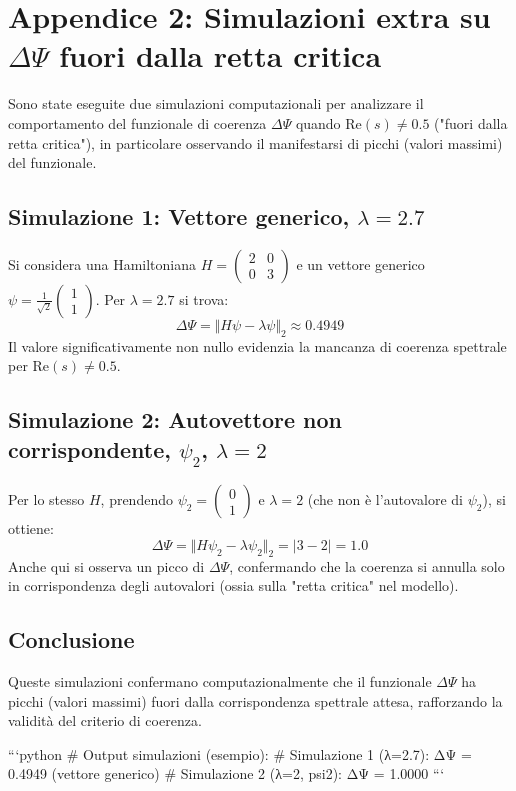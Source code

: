 \section*{Appendice 2: Simulazioni extra su $\Delta\Psi$ fuori dalla retta critica}

Sono state eseguite due simulazioni computazionali per analizzare il comportamento del funzionale di coerenza $\Delta\Psi$ quando $\mathrm{Re}(s)\neq 0.5$ ("fuori dalla retta critica"), in particolare osservando il manifestarsi di picchi (valori massimi) del funzionale.

\subsection*{Simulazione 1: Vettore generico, $\lambda=2.7$}

Si considera una Hamiltoniana $H = \begin{pmatrix}2 & 0\\0 & 3\end{pmatrix}$ e un vettore generico $\psi = \frac{1}{\sqrt{2}}\begin{pmatrix}1\\1\end{pmatrix}$.  
Per $\lambda=2.7$ si trova:
\[
\Delta\Psi = \Vert H\psi - \lambda\psi \Vert_2 \approx 0.4949
\]
Il valore significativamente non nullo evidenzia la mancanza di coerenza spettrale per $\mathrm{Re}(s)\neq 0.5$.

\subsection*{Simulazione 2: Autovettore non corrispondente, $\psi_2$, $\lambda=2$}

Per lo stesso $H$, prendendo $\psi_2 = \begin{pmatrix}0\\1\end{pmatrix}$ e $\lambda=2$ (che non è l'autovalore di $\psi_2$), si ottiene:
\[
\Delta\Psi = \Vert H\psi_2 - \lambda\psi_2 \Vert_2 = |3-2| = 1.0
\]
Anche qui si osserva un picco di $\Delta\Psi$, confermando che la coerenza si annulla solo in corrispondenza degli autovalori (ossia sulla "retta critica" nel modello).

\subsection*{Conclusione}

Queste simulazioni confermano computazionalmente che il funzionale $\Delta\Psi$ ha picchi (valori massimi) fuori dalla corrispondenza spettrale attesa, rafforzando la validità del criterio di coerenza.

```python
# Output simulazioni (esempio):
# Simulazione 1 (λ=2.7): ΔΨ = 0.4949 (vettore generico)
# Simulazione 2 (λ=2, psi2): ΔΨ = 1.0000
```